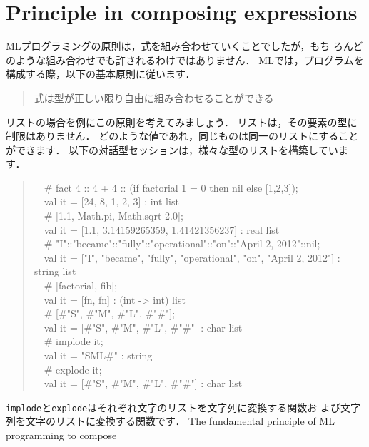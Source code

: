 \documentclass{jbook}
\newcommand{\txt}[2]{#2}
\newcommand{\myem}{\mbox{\ \ }}
\begin{document}
\section{\txt{式の組み合わせの原則}{Principle in composing expressions}}
\label{sec:tutorialTypingprinciple}

\ifjp%
	MLプログラミングの原則は，式を組み合わせていくことでしたが，もち
ろんどのような組み合わせでも許されるわけではありません．
	MLでは，プログラムを構成する際，以下の基本原則に従います．
\begin{quote}
式は型が正しい限り自由に組み合わせることができる
\end{quote}
	リストの場合を例にこの原則を考えてみましょう．
	リストは，その要素の型に制限はありません．
	どのような値であれ，同じものは同一のリストにすることができます．
	以下の対話型セッションは，様々な型のリストを構築しています．
\begin{tt}
\begin{quote}
\myem \# fact 4 :: 4 + 4 :: (if factorial 1 = 0 then nil else [1,2,3]);
\\\myem  val it = [24, 8, 1, 2, 3] : int list
\\\myem   \# [1.1, Math.pi, Math.sqrt 2.0];
\\\myem   val it = [1.1, 3.14159265359, 1.41421356237] : real list
\\\myem   \# "I"::"became"::"fully"::"operational"::"on"::"April 2, 2012"::nil;
\\\myem   val it = ["I", "became", "fully", "operational", "on", "April 2, 2012"] : string list
\\\myem   \# [factorial, fib];
\\\myem   val it = [fn, fn] : (int  -> int) list
\\\myem   \# [\#"S", \#"M", \#"L", \#"\#"];
\\\myem   val it = [\#"S", \#"M", \#"L", \#"\#"] : char list
\\\myem   \# implode it;
\\\myem   val it = "SML\#" : string
\\\myem   \# explode it;
\\\myem   val it = [\#"S", \#"M", \#"L", \#"\#"] : char list
\end{quote}
\end{tt}
{\tt implode}と{\tt explode}はそれぞれ文字のリストを文字列に変換する関数お
よび文字列を文字のリストに変換する関数です．
\else%
	The fundamental principle of ML programming to compose
\end{document}
